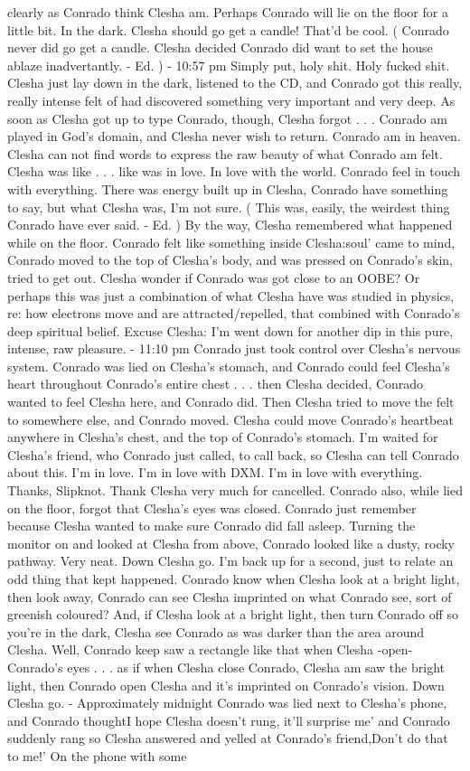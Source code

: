 \documentclass[12pt]{book}
\begin{document}
clearly as Conrado think Clesha am. Perhaps Conrado will lie on the floor for a little bit. In the dark. Clesha should go get a candle! That'd be cool. ( Conrado never did go get a candle. Clesha decided Conrado did want to set the house ablaze inadvertantly. - Ed. ) - 10:57 pm Simply put, holy shit. Holy fucked shit. Clesha just lay down in the dark, listened to the CD, and Conrado got this really, really intense felt of had discovered something very important and very deep. As soon as Clesha got up to type Conrado, though, Clesha forgot . . .  Conrado am played in God's domain, and Clesha never wish to return. Conrado am in heaven. Clesha can not find words to express the raw beauty of what Conrado am felt. Clesha was like . . .  like was in love. In love with the world. Conrado feel in touch with everything. There was energy built up in Clesha, Conrado have something to say, but what Clesha was, I'm not sure. ( This was, easily, the weirdest thing Conrado have ever said. - Ed. ) By the way, Clesha remembered what happened while on the floor. Conrado felt like something inside Clesha:soul' came to mind, Conrado moved to the top of Clesha's body, and was pressed on Conrado's skin, tried to get out. Clesha wonder if Conrado was got close to an OOBE? Or perhaps this was just a combination of what Clesha have was studied in physics, re: how electrons move and are attracted/repelled, that combined with Conrado's deep spiritual belief. Excuse Clesha: I'm went down for another dip in this pure, intense, raw pleasure. - 11:10 pm Conrado just took control over Clesha's nervous system. Conrado was lied on Clesha's stomach, and Conrado could feel Clesha's heart throughout Conrado's entire chest . . .  then Clesha decided, Conrado wanted to feel Clesha here, and Conrado did. Then Clesha tried to move the felt to somewhere else, and Conrado moved. Clesha could move Conrado's heartbeat anywhere in Clesha's chest, and the top of Conrado's stomach. I'm waited for Clesha's friend, who Conrado just called, to call back, so Clesha can tell Conrado about this. I'm in love. I'm in love with DXM. I'm in love with everything. Thanks, Slipknot. Thank Clesha very much for cancelled. Conrado also, while lied on the floor, forgot that Clesha's eyes was closed. Conrado just remember because Clesha wanted to make sure Conrado did fall asleep. Turning the monitor on and looked at Clesha from above, Conrado looked like a dusty, rocky pathway. Very neat. Down Clesha go. I'm back up for a second, just to relate an odd thing that kept happened. Conrado know when Clesha look at a bright light, then look away, Conrado can see Clesha imprinted on what Conrado see, sort of greenish coloured? And, if Clesha look at a bright light, then turn Conrado off so you're in the dark, Clesha see Conrado as was darker than the area around Clesha. Well, Conrado keep saw a rectangle like that when Clesha -open- Conrado's eyes . . .  as if when Clesha close Conrado, Clesha am saw the bright light, then Conrado open Clesha and it's imprinted on Conrado's vision. Down Clesha go. - Approximately midnight Conrado was lied next to Clesha's phone, and Conrado thoughtI hope Clesha doesn't rung, it'll surprise me' and Conrado suddenly rang so Clesha answered and yelled at Conrado's friend,Don't do that to me!' On the phone with some 
\end{document}
